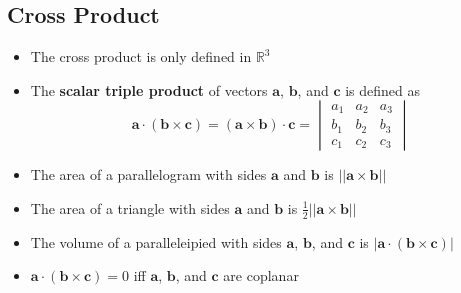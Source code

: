 \documentclass{article}
\begin{document}
\subsection{Cross Product}

\begin{itemize}
  \item The cross product is only defined in $\mathbb{R}^3$

  \item The \textbf{scalar triple product} of vectors $\mathbf{a}$, $\mathbf{b}$, and $\mathbf{c}$ is defined as \[\mathbf{a} \cdot (\mathbf{b} \times \mathbf{c}) = (\mathbf{a} \times \mathbf{b}) \cdot \mathbf{c} = \begin{vmatrix}
            a_1 & a_2 & a_3 \\
            b_1 & b_2 & b_3 \\
            c_1 & c_2 & c_3
          \end{vmatrix}\]

  \item The area of a parallelogram with sides $\mathbf{a}$ and $\mathbf{b}$ is $||\mathbf{a} \times \mathbf{b}||$

  \item The area of a triangle with sides $\mathbf{a}$ and $\mathbf{b}$ is $\frac{1}{2} ||\mathbf{a} \times \mathbf{b}||$

  \item The volume of a paralleleipied with sides $\mathbf{a}$, $\mathbf{b}$, and $\mathbf{c}$ is $|\mathbf{a} \cdot (\mathbf{b} \times \mathbf{c})|$

  \item $\mathbf{a} \cdot (\mathbf{b} \times \mathbf{c}) = 0$ iff $\mathbf{a}$, $\mathbf{b}$, and $\mathbf{c}$ are coplanar
\end{itemize}
\end{document}
